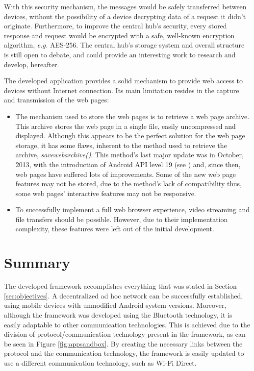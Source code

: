 \begin{itemize}
	With this security mechanism, the messages would be safely transferred between devices, without the possibility of a device decrypting data of a request it didn't originate. Furthermore, to improve the central hub's security, every stored response and request would be encrypted with a safe, well-known encryption algorithm, \textit{e.g.} \gls{AES}-256. The central hub's storage system and overall structure is still open to debate, and could provide an interesting work to research and develop, hereafter.
	
\end{itemize}

The developed application provides a solid mechanism to provide web access to devices without Internet connection. Its main limitation resides in the capture and transmission of the web pages:

\begin{itemize}
	
	\item The mechanism used to store the web pages is to retrieve a web page archive. This archive stores the web page in a single file, easily uncompressed and displayed. Although this appears to be the perfect solution for the web page storage, it has some flaws, inherent to the method used to retrieve the archive, \textit{savewebarchive()}. This method's last major update was in October, 2013, with the introduction of Android API level 19 (see \cite{kitkat}) and, since then, web pages have suffered lots of improvements. Some of the new web page features may not be stored, due to the method's lack of compatibility thus, some web pages' interactive features may not be responsive.
	
	\item To successfully implement a full web browser experience, video streaming and file transfers should be possible. However, due to their implementation complexity, these features were left out of the initial development.
	
\end{itemize}


\section{Summary}

The developed framework accomplishes everything that was stated in Section \ref{sec:objectives}. A decentralized ad hoc network can be successfully established, using mobile devices with unmodified Android system versions. Moreover, although the framework was developed using the Bluetooth technology, it is easily adaptable to other communication technologies. This is achieved due to the division of protocol/communication technology present in the framework, as can be seen in Figure \ref{fig:appsandbox}. By creating the necessary links between the protocol and the communication technology, the framework is easily updated to use a different communication technology, such as Wi-Fi Direct.

